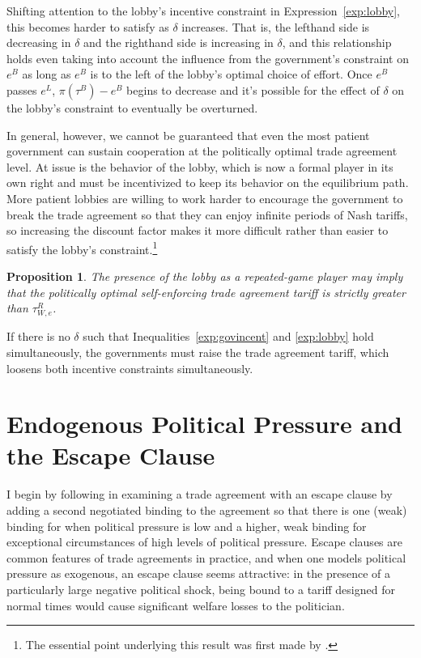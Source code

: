 \documentclass[12pt]{article}
\newtheorem{proposition}{Proposition}
\newcommand{\de}{\delta}
\begin{document}
Shifting attention to the lobby's incentive constraint in Expression~\ref{exp:lobby}, this becomes harder to satisfy as $\de$ increases. That is, the lefthand side is decreasing in $\de$ and the righthand side is increasing in $\de$, and this relationship holds even taking into account the influence from the government's constraint on $e^B$ as long as $e^B$ is to the left of the lobby's optimal choice of effort. Once $e^B$ passes $e^L$, $\pi(\tau^B) - e^B$ begins to decrease and it's possible for the effect of $\de$ on the lobby's constraint to eventually be overturned.

In general, however, we cannot be guaranteed that even the most patient government can sustain cooperation at the politically optimal trade agreement level. At issue is the behavior of the lobby, which is now a formal player in its own right and must be incentivized to keep its behavior on the equilibrium path. More patient lobbies are willing to work harder to encourage the government to break the trade agreement so that they can enjoy infinite periods of Nash tariffs, so increasing the discount factor makes it more difficult rather than easier to satisfy the lobby's constraint.\footnote{The essential point underlying this result was first made by \Textcite{buzard2013a}.}

\begin{proposition}
  The presence of the lobby as a repeated-game player may imply that the politically optimal self-enforcing trade agreement tariff is strictly greater than $\tau^R_{W,e}$.
	\label{res:repeated}
\end{proposition}

If there is no $\de$ such that Inequalities~\ref{exp:govincent} and \ref{exp:lobby} hold simultaneously, the governments must raise the trade agreement tariff, which loosens both incentive constraints simultaneously.

\section{Endogenous Political Pressure and the Escape Clause}
\label{sec:escape}
I begin by following \Textcite{bs2005} in examining a trade agreement with an escape clause by adding a second negotiated binding to the agreement so that there is one (weak) binding for when political pressure is low and a higher, weak binding for exceptional circumstances of high levels of political pressure. Escape clauses are common features of trade agreements in practice, and when one models political pressure as exogenous, an escape clause seems attractive: in the presence of a particularly large negative political shock, being bound to a tariff designed for normal times would cause significant welfare losses to the politician.
\end{document}
